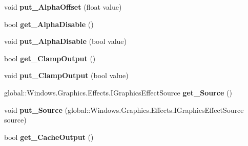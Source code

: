 \begin{DoxyCompactItemize}
void {\bfseries put\+\_\+\+Alpha\+Offset} (float value)
\item 
\mbox{\label{class_microsoft_1_1_graphics_1_1_canvas_1_1_effects_1_1_gamma_transfer_effect_ac99e552d17e439e01b9d30bd336d3cad}} 
bool {\bfseries get\+\_\+\+Alpha\+Disable} ()
\item 
\mbox{\label{class_microsoft_1_1_graphics_1_1_canvas_1_1_effects_1_1_gamma_transfer_effect_ae37bb6d2650bbe21081907b456fdaa91}} 
void {\bfseries put\+\_\+\+Alpha\+Disable} (bool value)
\item 
\mbox{\label{class_microsoft_1_1_graphics_1_1_canvas_1_1_effects_1_1_gamma_transfer_effect_a5a4f8fba325b4ab2ea79efe633af07c5}} 
bool {\bfseries get\+\_\+\+Clamp\+Output} ()
\item 
\mbox{\label{class_microsoft_1_1_graphics_1_1_canvas_1_1_effects_1_1_gamma_transfer_effect_aa0ea4517855831f3f871ce91779f071c}} 
void {\bfseries put\+\_\+\+Clamp\+Output} (bool value)
\item 
\mbox{\label{class_microsoft_1_1_graphics_1_1_canvas_1_1_effects_1_1_gamma_transfer_effect_a0a4fdf6b62a6e86407013ef990cbada3}} 
global\+::\+Windows.\+Graphics.\+Effects.\+I\+Graphics\+Effect\+Source {\bfseries get\+\_\+\+Source} ()
\item 
\mbox{\label{class_microsoft_1_1_graphics_1_1_canvas_1_1_effects_1_1_gamma_transfer_effect_aaf20d39a766d74d330782a240df170de}} 
void {\bfseries put\+\_\+\+Source} (global\+::\+Windows.\+Graphics.\+Effects.\+I\+Graphics\+Effect\+Source source)
\item 
\mbox{\label{class_microsoft_1_1_graphics_1_1_canvas_1_1_effects_1_1_gamma_transfer_effect_a8c3ef83f13317680438dd13a062aaf3c}} 
bool {\bfseries get\+\_\+\+Cache\+Output} ()

\end{DoxyCompactItemize}
